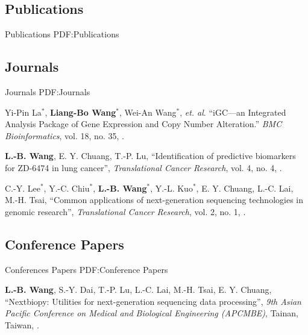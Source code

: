 \documentclass[a4paper,12pt,oneside]{article}
\begin{document}
\begin{body}

\section{Publications}
{Publications}
{PDF:Publications}

\subsection{Journals}
{Journals}
{PDF:Journals}

\begin{publication}[series=pub, widest*=100]

    \item
        Yi-Pin La$^*$, \textbf{Liang-Bo Wang}$^*$, Wei-An Wang$^*$, \textit{et. al}.
        ``iGC—an Integrated Analysis Package of Gene Expression and Copy Number Alteration.''
        \textit{BMC Bioinformatics}, vol. 18, no. 35,
        .

    \item
        \textbf{L.-B. Wang}, E. Y. Chuang, T.-P. Lu,
        ``Identification of predictive biomarkers for ZD-6474 in lung cancer'',
        \textit{Translational Cancer Research}, vol. 4, no. 4,
        .

    \item
        C.-Y. Lee$^*$, Y.-C. Chiu$^*$, \textbf{L.-B. Wang}$^*$, Y.-L. Kuo$^*$, E. Y. Chuang, L.-C. Lai, M.-H. Tsai,
        ``Common applications of next-generation sequencing technologies in genomic research'',
        \textit{Translational Cancer Research}, vol. 2, no. 1,
        .
\end{publication}

\BigEntryGap
\subsection{Conference Papers}
{Conferences Papers}
{PDF:Conference Papers}

\begin{publication}[widest*=100]  %

    \item
        \textbf{L.-B. Wang}, S.-Y. Dai, T.-P. Lu, L.-C. Lai, M.-H. Tsai, E. Y. Chuang,
        ``Nextbiopy: Utilities for next-generation sequencing data processing'',
        \textit{9th Asian Pacific Conference on Medical and Biological Engineering (APCMBE)},
        Tainan, Taiwan,
        .


\end{publication}
\end{body}
\end{document}

